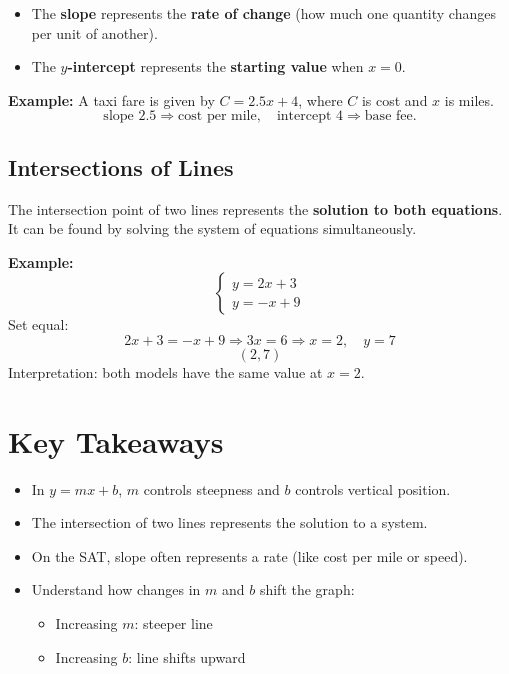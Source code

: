 \documentclass[14pt]{extarticle}
\begin{document}
\begin{itemize}
    \item The \textbf{slope} represents the \textbf{rate of change} (how much one quantity changes per unit of another).
    \item The \textbf{\(y\)-intercept} represents the \textbf{starting value} when \(x = 0\).
\end{itemize}

\textbf{Example:}  
A taxi fare is given by \(C = 2.5x + 4\), where \(C\) is cost and \(x\) is miles.
\[
\text{slope } 2.5 \Rightarrow \text{cost per mile}, \quad \text{intercept } 4 \Rightarrow \text{base fee}.
\]

\subsection*{Intersections of Lines}
The intersection point of two lines represents the \textbf{solution to both equations}.  
It can be found by solving the system of equations simultaneously.

\textbf{Example:}
\[
\begin{cases}
y = 2x + 3 \\
y = -x + 9
\end{cases}
\]
Set equal:
\[
2x + 3 = -x + 9 \Rightarrow 3x = 6 \Rightarrow x = 2, \quad y = 7
\]
\[
\boxed{(2, 7)}
\]
Interpretation: both models have the same value at \(x = 2\).

\section*{Key Takeaways}
\begin{itemize}
    \item In \(y = mx + b\), \(m\) controls steepness and \(b\) controls vertical position.
    \item The intersection of two lines represents the solution to a system.
    \item On the SAT, slope often represents a rate (like cost per mile or speed).
    \item Understand how changes in \(m\) and \(b\) shift the graph:
    \begin{itemize}
        \item Increasing \(m\): steeper line
        \item Increasing \(b\): line shifts upward
    \end{itemize}
\end{itemize}
\end{document}
